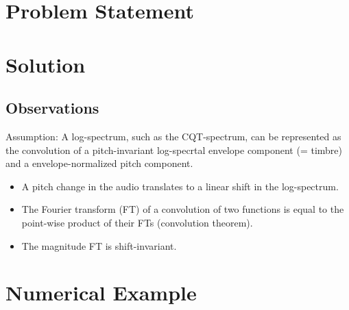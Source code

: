 \documentclass[journal]{IEEEtran}
\begin{document}
\section{Problem Statement}

% 





\section{Solution}

\subsection{Observations}

Assumption: A log-spectrum, such as the CQT-spectrum, can be represented as the convolution of a pitch-invariant log-specrtal envelope component (= timbre) and a envelope-normalized pitch component.

\begin{itemize}
\item A pitch change in the audio translates to a linear shift in the log-spectrum.
\item The Fourier transform (FT) of a convolution of two functions is equal to the point-wise product of their FTs (convolution theorem).
\item The magnitude FT is shift-invariant.
\end{itemize}




\section{Numerical Example}

%

\end{document}

